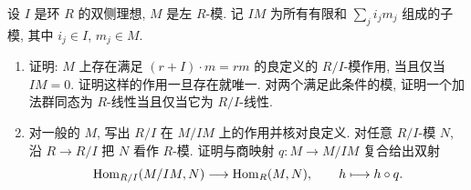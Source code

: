 \documentclass{article}
\begin{document}
\begin{problem}
设 $I$ 是环 $R$ 的双侧理想, $M$ 是左 $R$-模. 记 $IM$ 为所有有限和 $\sum_j i_jm_j$ 组成的子模, 其中 $i_j\in I$, $m_j\in M$.
\begin{enumerate}
  \item[(a)] 证明: $M$ 上存在满足 $(r+I)\cdot m=rm$ 的良定义的 $R/I$-模作用, 当且仅当 $IM=0$. 证明这样的作用一旦存在就唯一. 对两个满足此条件的模, 证明一个加法群同态为 $R$-线性当且仅当它为 $R/I$-线性.
  \item[(b)] 对一般的 $M$, 写出 $R/I$ 在 $M/IM$ 上的作用并核对良定义. 对任意 $R/I$-模 $N$, 沿 $R\to R/I$ 把 $N$ 看作 $R$-模. 证明与商映射 $q:M\to M/IM$ 复合给出双射
  \[
    \operatorname{Hom}_{R/I}(M/IM,N)\longrightarrow\operatorname{Hom}_R(M,N),\qquad h\longmapsto h\circ q.
  \]
\end{enumerate}
\end{problem}
\end{document}
